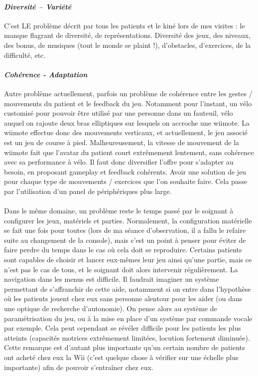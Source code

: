 		\paragraph{\emph{Diversité – Variété}\\}
C'est LE problème décrit par tous les patients et le kiné lors de mes visites : le manque flagrant de diversité, de représentations. Diversité des jeux, des niveaux, des bonus, de musiques (tout le monde se plaint !), d'obstacles, d'exercices, de la difficulté, etc.

		\paragraph{\emph{Cohérence - Adaptation}\\}
Autre problème actuellement, parfois un problème de cohérence entre les gestes / mouvements du patient et le feedback du jeu. Notamment pour l'instant, un vélo customisé pour pouvoir être utilisé par une personne dans un fauteuil, vélo auquel on rajoute deux bras elliptiques sur lesquels on accroche une wiimote. La wiimote effectue donc des mouvements verticaux, et actuellement, le jeu associé est un jeu de course à pied. Malheureusement, la vitesse de mouvement de la wiimote fait que l'avatar du patient court extrêmement lentement, sans cohérence avec sa performance à vélo.
Il faut donc diversifier l'offre pour s'adapter au besoin, en proposant gameplay et feedback cohérents. Avoir une solution de jeu pour chaque type de mouvements / exercices que l'on souhaite faire. Cela passe par l'utilisation d'un panel de périphériques plus large.

\paragraph{}Dans le même domaine, un problème reste le temps passé par le soignant à configurer les jeux, matériels et parties. Normalement, la configuration matérielle se fait une fois pour toutes (lors de ma séance d'observation, il a fallu le refaire suite au changement de la console), mais c'est un point à penser pour éviter de faire perdre du temps dans le cas où cela doit se reproduire.
Certains patients sont capables de choisir et lancer eux-mêmes leur jeu ainsi qu'une partie, mais ce n'est pas le cas de tous, et le soignant doit alors intervenir régulièrement. La navigation dans les menus est difficile. Il faudrait imaginer un système permettant de s'affranchir de cette aide, notamment si on entre dans l'hypothèse où les patients jouent chez eux sans personne alentour pour les aider (ou dans une optique de recherche d'autonomie). On pense alors au système de paramétrisation du jeu, ou à la mise en place d'un système par commande vocale par exemple. Cela peut cependant se révéler difficile pour les patients les plus atteints (capacités motrices extrêmement limitées, locution fortement diminuée). Cette remarque est d'autant plus importante qu'un certain nombre de patients ont acheté chez eux la Wii (c'est quelque chose à vérifier sur une échelle plus importante) afin de pouvoir s'entraîner chez eux.


